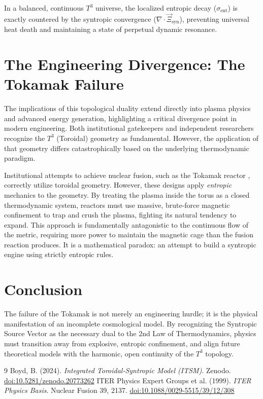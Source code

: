 \documentclass[aps,prd,11pt,onecolumn,superscriptaddress,nofootinbib,floatfix]{revtex4-2}
\begin{document}
In a balanced, continuous $T^3$ universe, the localized entropic decay ($\sigma_{\text{ent}}$) is exactly countered by the syntropic convergence ($\nabla \cdot \vec{\Xi}_{\text{syn}}$), preventing universal heat death and maintaining a state of perpetual dynamic resonance.

\section{The Engineering Divergence: The Tokamak Failure}
\label{sec:divergence}

The implications of this topological duality extend directly into plasma physics and advanced energy generation, highlighting a critical divergence point in modern engineering. Both institutional gatekeepers and independent researchers recognize the $T^3$ (Toroidal) geometry as fundamental. However, the application of that geometry differs catastrophically based on the underlying thermodynamic paradigm.

Institutional attempts to achieve nuclear fusion, such as the Tokamak reactor \cite{iter_basis}, correctly utilize toroidal geometry. However, these designs apply \textit{entropic} mechanics to the geometry. By treating the plasma inside the torus as a closed thermodynamic system, reactors must use massive, brute-force magnetic confinement to trap and crush the plasma, fighting its natural tendency to expand. This approach is fundamentally antagonistic to the continuous flow of the metric, requiring more power to maintain the magnetic cage than the fusion reaction produces. It is a mathematical paradox: an attempt to build a syntropic engine using strictly entropic rules.

\section{Conclusion}
\label{sec:conclusion}

The failure of the Tokamak is not merely an engineering hurdle; it is the physical manifestation of an incomplete cosmological model. By recognizing the Syntropic Source Vector as the necessary dual to the 2nd Law of Thermodynamics, physics must transition away from explosive, entropic confinement, and align future theoretical models with the harmonic, open continuity of the $T^3$ topology.


\begin{thebibliography}{9}
 Boyd, B. (2024). \textit{Integrated Toroidal-Syntropic Model (ITSM)}. Zenodo. \href{https://doi.org/10.5281/zenodo.20773262}{doi:10.5281/zenodo.20773262}
 ITER Physics Expert Groups et al. (1999). \textit{ITER Physics Basis}. Nuclear Fusion 39, 2137. \href{https://doi.org/10.1088/0029-5515/39/12/308}{doi:10.1088/0029-5515/39/12/308}
\end{thebibliography}
\end{document}
